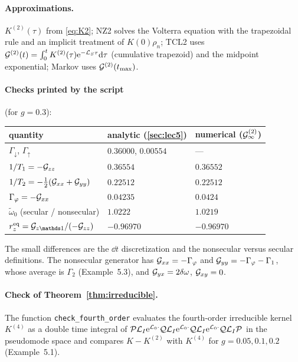 \paragraph{Approximations.}
$K^{(2)}(\tau)$ from \cref{eq:K2}; NZ2 solves the Volterra equation with the trapezoidal rule and an implicit treatment of $K(0)\rho_n$; TCL2 uses $\mathcal{G}^{(2)}(t)=\int_0^tK^{(2)}(\tau)\mathrm{e}^{-\mathcal{L}_S\tau}\mathrm{d}\tau$ (cumulative trapezoid) and the midpoint exponential; Markov uses $\mathcal{G}^{(2)}(t_{\max})$.

\paragraph{Checks printed by the script} (for $g=0.3$):
\begin{center}
\small
\begin{tabular}{@{}lll@{}}
\toprule
quantity & analytic (\cref{sec:lec5}) & numerical ($\mathcal{G}^{(2)}_\infty$)\\
\midrule
$\Gamma_\downarrow$, $\Gamma_\uparrow$ & $0.36000$, $0.00554$ & --- \\
$1/T_1=-\mathcal{G}_{zz}$ & $0.36554$ & $0.36552$\\
$1/T_2=-\tfrac12(\mathcal{G}_{xx}+\mathcal{G}_{yy})$ & $0.22512$ & $0.22512$\\
$\Gamma_\varphi=-\mathcal{G}_{xx}$ & $0.04235$ & $0.0424$\\
$\tilde\omega_0$ (secular / nonsecular) & $1.0222$ & $1.0219$\\
$r_z^{\rm eq}=\Gc_{z\Id}/(-\Gc_{zz})$ & $-0.96970$ & $-0.96970$\\
\bottomrule
\end{tabular}
\end{center}
The small differences are the $\dd t$ discretization and the nonsecular versus secular definitions.
The nonsecular generator has $\mathcal{G}_{xx}=-\Gamma_\varphi$ and $\mathcal{G}_{yy}=-\Gamma_\varphi-\Gamma_1$, whose average is $\Gamma_2$ (Example~5.3), and $\mathcal{G}_{yx}=2\delta\omega$, $\mathcal{G}_{xy}=0$.

\paragraph{Check of Theorem~\ref{thm:irreducible}.}
The function \texttt{check\_fourth\_order} evaluates the fourth-order irreducible kernel $K^{(4)}$ as a double time integral of $\mathcal{P}\mathcal{L}_I\mathrm{e}^{\mathcal{L}_0\cdot}\mathcal{Q}\mathcal{L}_I\mathrm{e}^{\mathcal{L}_0\cdot}\mathcal{Q}\mathcal{L}_I\mathrm{e}^{\mathcal{L}_0\cdot}\mathcal{Q}\mathcal{L}_I\mathcal{P}$ in the pseudomode space and compares $K-K^{(2)}$ with $K^{(4)}$ for $g=0.05,0.1,0.2$ (Example~5.1).

